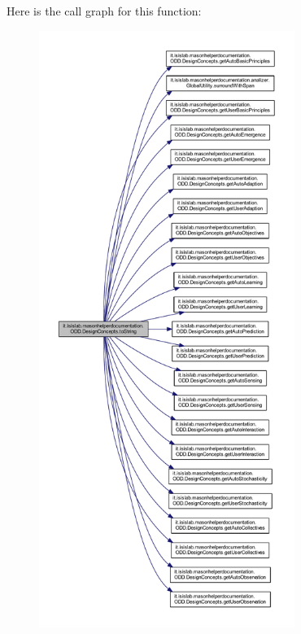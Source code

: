 Here is the call graph for this function\-:\nopagebreak
\begin{figure}[H]
\begin{center}
\leavevmode
\includegraphics[height=550pt]{classit_1_1isislab_1_1masonhelperdocumentation_1_1_o_d_d_1_1_design_concepts_a77f77282f4f064e0bf3c80c6bf47c7ce_cgraph}
\end{center}
\end{figure}




